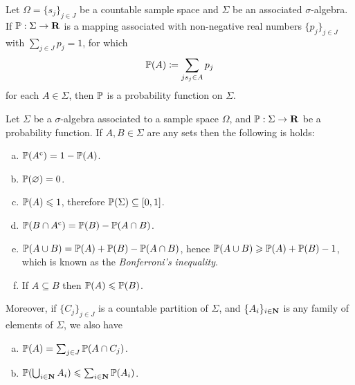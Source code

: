\begin{lemma}
    \label{lem:probability-function}
    Let \(\Omega = \{s_j\}_{j \in J}\) be a countable sample space and \(\Sigma\) be
    an associated \(\sigma\)-algebra. If \(\operatorname{\mathbb{P}}: \Sigma \to \mathbf{R}\) is a mapping
    associated with non-negative real numbers \(\{p_j\}_{j \in J}\) with
    \(\sum_{j \in J} p_j = 1\), for which
    \[
        \operatorname{\mathbb{P}}(A) \coloneq \sum_{j \relax s_j \in A} p_j
    \]
    for each \(A \in \Sigma\), then \(\operatorname{\mathbb{P}}\) is a probability function on \(\Sigma\).
\end{lemma}

\begin{theorem}
    \label{thm:probability-calculus-basics}
    Let \(\Sigma\) be a \(\sigma\)-algebra associated to a sample space \(\Omega\),
    and \(\operatorname{\mathbb{P}}: \Sigma \to \mathbf{R}\) be a probability function. If \(A, B \in \Sigma\) are
    any sets then the following is holds:
    \begin{enumerate}[(a)]\setlength\itemsep{0em}
        \item \(\operatorname{\mathbb{P}}({A}^{\text{c}}) = 1 - \operatorname{\mathbb{P}}(A)\).
        \item \(\operatorname{\mathbb{P}}(\varnothing) = 0\).
        \item \(\operatorname{\mathbb{P}}(A) \leqslant 1\), therefore \(\operatorname{\mathbb{P}}(\Sigma) \subseteq [0, 1]\).
        \item \(\operatorname{\mathbb{P}}(B \cap {A}^{\text{c}}) = \operatorname{\mathbb{P}}(B) - \operatorname{\mathbb{P}}(A \cap B)\).
        \item \(\operatorname{\mathbb{P}}(A \cup B) = \operatorname{\mathbb{P}}(A) + \operatorname{\mathbb{P}}(B) - \operatorname{\mathbb{P}}(A \cap B)\), hence
              \(\operatorname{\mathbb{P}}(A \cup B) \geqslant \operatorname{\mathbb{P}}(A) + \operatorname{\mathbb{P}}(B) - 1\), which is known as the
              \emph{Bonferroni's inequality}.
        \item If \(A \subseteq B\) then \(\operatorname{\mathbb{P}}(A) \leqslant \operatorname{\mathbb{P}}(B)\).
    \end{enumerate}
    Moreover, if \(\{C_{j}\}_{j \in J}\) is a countable partition of \(\Sigma\), and
    \(\{A_i\}_{i \in \mathbf{N}}\) is any family of elements of \(\Sigma\), we also have
    \begin{enumerate}[(a)]\setlength\itemsep{0em}\setcounter{enumi}{6}
        \item \(\operatorname{\mathbb{P}}(A) = \sum_{j \in J} \operatorname{\mathbb{P}}(A \cap C_j)\).
        \item \(\operatorname{\mathbb{P}}(\bigcup_{i \in \mathbf{N}} A_i) \leqslant \sum_{i \in \mathbf{N}} \operatorname{\mathbb{P}}(A_i)\).
    \end{enumerate}
\end{theorem}

